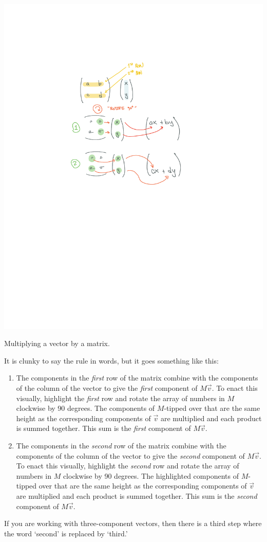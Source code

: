 \begin{marginfigure}%
    \includegraphics[width=\textwidth]{figures/MatrixMult_2220.pdf}
    \caption{Multiplying a vector by a matrix.}
    \label{fig:matrix:mult:2220}
\end{marginfigure}
It is clunky to say the rule in words, but it goes something like this: 
\begin{enumerate}
    \item The components in the \emph{first} row of the matrix combine with the components of the column of the vector to give the \emph{first} component of $M\vec{v}$. To enact this visually,  highlight the \emph{first} row and rotate the array of numbers in $M$ clockwise by 90 degrees. The components of $M$-tipped over that are the same height as the corresponding components of $\vec{v}$ are multiplied and each product is summed together. This sum is the \emph{first} component of $M\vec{v}$.
    \item The components in the \emph{second} row of the matrix combine with the components of the column of the vector to give the \emph{second} component of $M\vec{v}$. To enact this visually,  highlight the \emph{second} row and rotate the array of numbers in $M$ clockwise by 90 degrees. The highlighted components of $M$-tipped over that are the same height as the corresponding components of $\vec{v}$ are multiplied and each product is summed together. This sum is the \emph{second} component of $M\vec{v}$.
\end{enumerate}
If you are working with three-component vectors, then there is a third step where the word `second' is replaced by `third.' 

